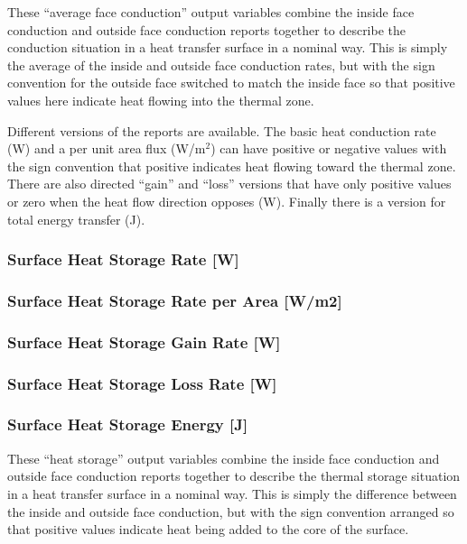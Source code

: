 These ``average face conduction'' output variables combine the inside face conduction and outside face conduction reports together to describe the conduction situation in a heat transfer surface in a nominal way. This is simply the average of the inside and outside face conduction rates, but with the sign convention for the outside face switched to match the inside face so that positive values here indicate heat flowing into the thermal zone.

Different versions of the reports are available. The basic heat conduction rate (W) and a per unit area flux (W/m\(^{2}\)) can have positive or negative values with the sign convention that positive indicates heat flowing toward the thermal zone. There are also directed ``gain'' and ``loss'' versions that have only positive values or zero when the heat flow direction opposes (W). Finally there is a version for total energy transfer (J).

\subsubsection{Surface Heat Storage Rate {[}W{]}}\label{surface-heat-storage-rate-w}

\subsubsection{Surface Heat Storage Rate per Area {[}W/m2{]}}\label{surface-heat-storage-rate-per-area-wm2}

\subsubsection{Surface Heat Storage Gain Rate {[}W{]}}\label{surface-heat-storage-gain-rate-w}

\subsubsection{Surface Heat Storage Loss Rate {[}W{]}}\label{surface-heat-storage-loss-rate-w}

\subsubsection{Surface Heat Storage Energy {[}J{]}}\label{surface-heat-storage-energy-j}

These ``heat storage'' output variables combine the inside face conduction and outside face conduction reports together to describe the thermal storage situation in a heat transfer surface in a nominal way. This is simply the difference between the inside and outside face conduction, but with the sign convention arranged so that positive values indicate heat being added to the core of the surface.

